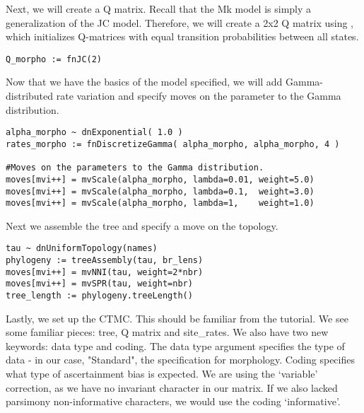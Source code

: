 Next, we will create a Q matrix. 
Recall that the Mk model is simply a generalization of the JC model.
Therefore, we will create a 2x2 Q matrix using , which initializes Q-matrices with equal transition probabilities between all states.

{\tt \begin{snugshade*}
\begin{lstlisting}
Q_morpho := fnJC(2)
\end{lstlisting}
\end{snugshade*}}

Now that we have the basics of the model specified, we will add Gamma-distributed rate variation and specify moves on the parameter to the Gamma distribution.


{\tt \begin{snugshade*}
\begin{lstlisting}
alpha_morpho ~ dnExponential( 1.0 )
rates_morpho := fnDiscretizeGamma( alpha_morpho, alpha_morpho, 4 )

#Moves on the parameters to the Gamma distribution.
moves[mvi++] = mvScale(alpha_morpho, lambda=0.01, weight=5.0)
moves[mvi++] = mvScale(alpha_morpho, lambda=0.1,  weight=3.0)
moves[mvi++] = mvScale(alpha_morpho, lambda=1,    weight=1.0)
\end{lstlisting}
\end{snugshade*}}

Next we assemble the tree and specify a move on the topology.

{\tt \begin{snugshade*}
\begin{lstlisting}
tau ~ dnUniformTopology(names)
phylogeny := treeAssembly(tau, br_lens)
moves[mvi++] = mvNNI(tau, weight=2*nbr)
moves[mvi++] = mvSPR(tau, weight=nbr)
tree_length := phylogeny.treeLength()
\end{lstlisting}
\end{snugshade*}}

Lastly, we set up the CTMC. 
This should be familiar from the  tutorial.
We see some familiar pieces: tree, Q matrix and site\_rates.
We also have two new keywords: data type and coding.
The data type argument specifies the type of data - in our case, "Standard", the specification for morphology.
Coding specifies what type of ascertainment bias is expected.
We are using the `variable' correction, as we have no invariant character in our matrix.
If we also lacked parsimony non-informative characters, we would use the coding `informative'. 

